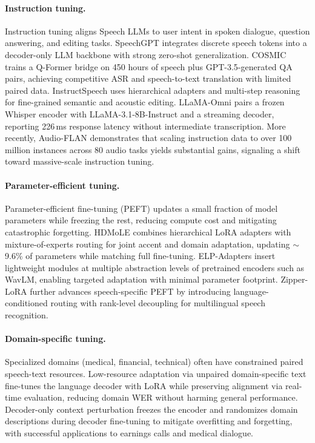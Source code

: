 \paragraph{Instruction tuning.}
Instruction tuning aligns Speech LLMs to user intent in spoken dialogue,
question answering, and editing tasks. SpeechGPT
\citep{zhang2023speechgptempoweringlargelanguage} integrates discrete
speech tokens into a decoder-only LLM backbone with strong zero-shot
generalization. COSMIC \citep{pan2024cosmicdataefficientinstructiontuning}
trains a Q-Former bridge on 450 hours of speech plus GPT-3.5-generated
QA pairs, achieving competitive ASR and speech-to-text translation with
limited paired data. InstructSpeech \citep{huang2024instructspeech} uses
hierarchical adapters and multi-step reasoning for fine-grained semantic
and acoustic editing. LLaMA-Omni
\citep{fang2025llamaomniseamlessspeechinteraction} pairs a frozen Whisper
encoder with LLaMA-3.1-8B-Instruct and a streaming decoder, reporting
226\,ms response latency without intermediate transcription. More
recently, Audio-FLAN \citep{xue2025audioflan} demonstrates that scaling
instruction data to over 100 million instances across 80 audio tasks
yields substantial gains, signaling a shift toward
massive-scale instruction tuning.

\paragraph{Parameter-efficient tuning.}
Parameter-efficient fine-tuning (PEFT) updates a small fraction of model
parameters while freezing the rest, reducing compute cost and mitigating
catastrophic forgetting. HDMoLE \citep{mu2025hdmolemixtureloraexperts}
combines hierarchical LoRA adapters with mixture-of-experts routing for
joint accent and domain adaptation, updating $\sim$9.6\% of parameters
while matching full fine-tuning. ELP-Adapters
\citep{inoue2024elpadaptersparameterefficientadapter} insert lightweight
modules at multiple abstraction levels of pretrained encoders such as
WavLM, enabling targeted adaptation with minimal parameter footprint.
Zipper-LoRA \citep{mei2026zipperlora} further advances speech-specific
PEFT by introducing language-conditioned routing with rank-level
decoupling for multilingual speech recognition.

\paragraph{Domain-specific tuning.}
Specialized domains (medical, financial, technical) often have
constrained paired speech-text resources. Low-resource adaptation via
unpaired domain-specific text \citep{fang2025lowresourcedomainadaptationspeech}
fine-tunes the language decoder with LoRA while preserving alignment via
real-time evaluation, reducing domain WER without harming general
performance. Decoder-only context perturbation \citep{suh2024improving}
freezes the encoder and randomizes domain descriptions during decoder
fine-tuning to mitigate overfitting and forgetting, with successful
applications to earnings calls and medical dialogue.

